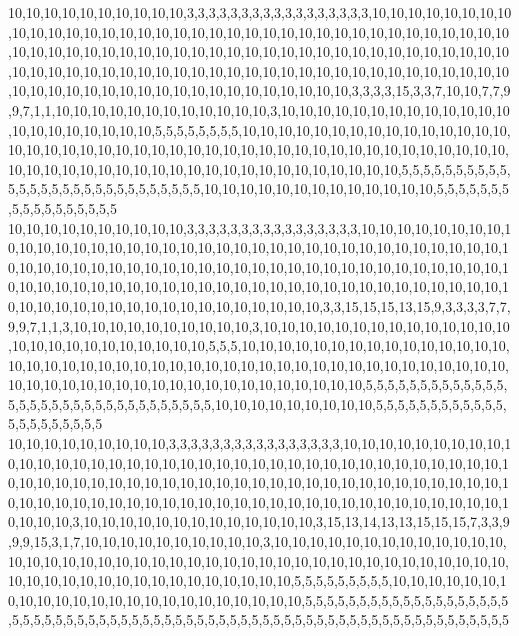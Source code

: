 10,10,10,10,10,10,10,10,10,10,3,3,3,3,3,3,3,3,3,3,3,3,3,3,3,3,3,10,10,10,10,10,10,10,10,10,10,10,10,10,10,10,10,10,10,10,10,10,10,10,10,10,10,10,10,10,10,10,10,10,10,10,10,10,10,10,10,10,10,10,10,10,10,10,10,10,10,10,10,10,10,10,10,10,10,10,10,10,10,10,10,10,10,10,10,10,10,10,10,10,10,10,10,10,10,10,10,10,10,10,10,10,10,10,10,10,10,10,10,10,10,10,10,10,10,10,10,10,10,10,10,10,10,10,10,10,10,10,3,3,3,3,15,3,3,7,10,10,7,7,9,9,7,1,1,10,10,10,10,10,10,10,10,10,10,10,10,3,10,10,10,10,10,10,10,10,10,10,10,10,10,10,10,10,10,10,10,10,10,5,5,5,5,5,5,5,5,10,10,10,10,10,10,10,10,10,10,10,10,10,10,10,10,10,10,10,10,10,10,10,10,10,10,10,10,10,10,10,10,10,10,10,10,10,10,10,10,10,10,10,10,10,10,10,10,10,10,10,10,10,10,10,10,10,10,10,10,10,10,10,10,10,5,5,5,5,5,5,5,5,5,5,5,5,5,5,5,5,5,5,5,5,5,5,5,5,5,5,5,5,10,10,10,10,10,10,10,10,10,10,10,10,10,5,5,5,5,5,5,5,5,5,5,5,5,5,5,5,5,5
10,10,10,10,10,10,10,10,10,10,3,3,3,3,3,3,3,3,3,3,3,3,3,3,3,3,10,10,10,10,10,10,10,10,10,10,10,10,10,10,10,10,10,10,10,10,10,10,10,10,10,10,10,10,10,10,10,10,10,10,10,10,10,10,10,10,10,10,10,10,10,10,10,10,10,10,10,10,10,10,10,10,10,10,10,10,10,10,10,10,10,10,10,10,10,10,10,10,10,10,10,10,10,10,10,10,10,10,10,10,10,10,10,10,10,10,10,10,10,10,10,10,10,10,10,10,10,10,10,10,10,10,10,10,10,10,3,3,15,15,15,13,15,9,3,3,3,3,7,7,9,9,7,1,1,3,10,10,10,10,10,10,10,10,10,10,3,10,10,10,10,10,10,10,10,10,10,10,10,10,10,10,10,10,10,10,10,10,10,10,10,10,5,5,5,10,10,10,10,10,10,10,10,10,10,10,10,10,10,10,10,10,10,10,10,10,10,10,10,10,10,10,10,10,10,10,10,10,10,10,10,10,10,10,10,10,10,10,10,10,10,10,10,10,10,10,10,10,10,10,10,10,10,10,10,10,10,10,5,5,5,5,5,5,5,5,5,5,5,5,5,5,5,5,5,5,5,5,5,5,5,5,5,5,5,5,5,5,5,5,10,10,10,10,10,10,10,10,10,5,5,5,5,5,5,5,5,5,5,5,5,5,5,5,5,5,5,5,5,5
10,10,10,10,10,10,10,10,10,3,3,3,3,3,3,3,3,3,3,3,3,3,3,3,3,10,10,10,10,10,10,10,10,10,10,10,10,10,10,10,10,10,10,10,10,10,10,10,10,10,10,10,10,10,10,10,10,10,10,10,10,10,10,10,10,10,10,10,10,10,10,10,10,10,10,10,10,10,10,10,10,10,10,10,10,10,10,10,10,10,10,10,10,10,10,10,10,10,10,10,10,10,10,10,10,10,10,10,10,10,10,10,10,10,10,10,10,10,10,10,10,10,3,10,10,10,10,10,10,10,10,10,10,10,10,10,3,15,13,14,13,13,15,15,15,7,3,3,9,9,9,15,3,1,7,10,10,10,10,10,10,10,10,10,10,3,10,10,10,10,10,10,10,10,10,10,10,10,10,10,10,10,10,10,10,10,10,10,10,10,10,10,10,10,10,10,10,10,10,10,10,10,10,10,10,10,10,10,10,10,10,10,10,10,10,10,10,10,10,10,10,10,10,5,5,5,5,5,5,5,5,5,10,10,10,10,10,10,10,10,10,10,10,10,10,10,10,10,10,10,10,10,10,10,10,5,5,5,5,5,5,5,5,5,5,5,5,5,5,5,5,5,5,5,5,5,5,5,5,5,5,5,5,5,5,5,5,5,5,5,5,5,5,5,5,5,5,5,5,5,5,5,5,5,5,5,5,5,5,5,5,5,5,5,5,5,5,5,5,5
